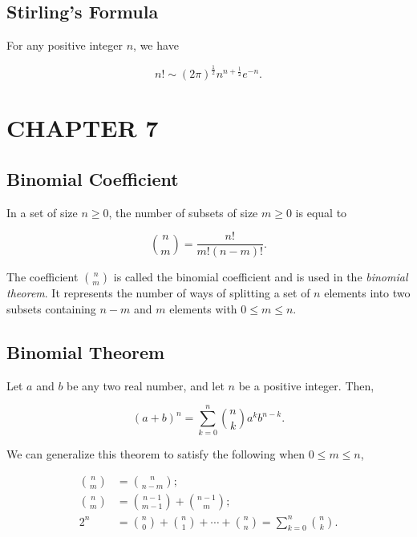 \documentclass[12pt]{article}
\begin{document}
\subsection*{Stirling's Formula}
\noindent
For any positive integer $n$, we have 

\begin{equation}
n! \sim (2 \pi)^{\frac{1}{2}} n^{n + \frac{1}{2}} e^{-n}.
\end{equation}
\section*{CHAPTER 7}
\subsection*{Binomial Coefficient}
\noindent
In a set of size $n \geq 0$, the number of subsets of size $m \geq 0$ is equal to 

\begin{equation*}
{n \choose m} = \frac{n!}{m! (n-m)!}.
\end{equation*}

\noindent
The coefficient ${n \choose m}$ is called the binomial coefficient and is used in the \textit{binomial theorem}. It represents the number of ways of splitting a set of $n$ elements into two subsets containing $n-m$ and $m$ elements with $0 \leq m \leq n$.

\subsection*{Binomial Theorem}
\noindent
Let $a$ and $b$ be any two real number, and let $n$ be a positive integer. Then, 

\begin{equation*}
(a+b)^n = \sum_{k=0}^{n} {n \choose k} a^k b^{n-k}.
\end{equation*}

\noindent
We can generalize this theorem to satisfy the following when $0 \leq m \leq n$,

\begin{align*}
{n \choose m} & = {n \choose n-m}; \\
{n \choose m} & = {n-1 \choose m-1} + {n-1 \choose m}; \\
2^n & = {n \choose 0} + {n \choose 1} + \cdots + {n \choose n} = \sum_{k=0}^{n} {n \choose k}. \\
\end{align*}
\end{document}
